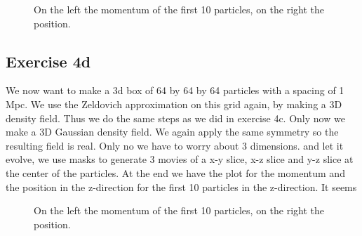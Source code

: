 \begin{figure}
    \centering
    \qquad
    \caption{On the left the momentum of the first 10 particles, on the right the position.}
    \label{fig:z}
\end{figure}


\subsection{Exercise 4d}
We now want to make a 3d box of 64 by 64 by 64 particles with a spacing of 1 Mpc. We use the Zeldovich approximation on this grid again, by making a 3D density field. Thus we do the same steps as we did in exercise 4c. Only now we make a 3D Gaussian density field. We again apply the same symmetry so the resulting field is real. Only no we have to worry about 3 dimensions.
and let it evolve, we use masks to generate 3 movies of a x-y slice, x-z slice and y-z slice at the center of the particles. At the end we have the plot for the momentum and the position in the z-direction for the first 10 particles in the z-direction. It seems 

\begin{figure}
    \centering
    \qquad
    \caption{On the left the momentum of the first 10 particles, on the right the position.}
    \label{fig:z}
\end{figure}

